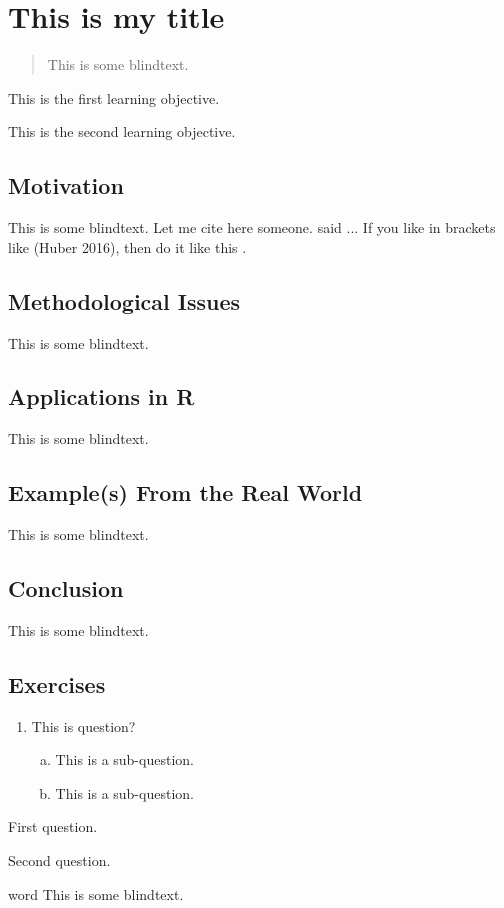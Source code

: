 \chapter{This is my title}\label{ch:topic1}
	
	\begin{abstract}
		This is some blindtext.
	\end{abstract}
	
	\begin{goals}
		\item This is the first learning objective. 
		\item This is the second learning objective. 
	\end{goals}
	
	\section{Motivation}

This is some blindtext.
Let me cite here someone. \citet{eck2016product} said ...
If you like in brackets like (Huber 2016), then do it like this \citep{eck2016product}.

	\section{Methodological Issues}

This is some blindtext.

	\section{Applications in R}\label{sec:applicationsinR}

This is some blindtext.

	\section{Example(s) From the Real World}\label{sec:examplerealworld}
This is some blindtext.

	\section{Conclusion}
This is some blindtext.

	\section{Exercises}
	\begin{enumerate}[(1)]
		\item This is question?
		\begin{enumerate}[a)]
			\item This is a sub-question.
			\item This is a sub-question.
		\end{enumerate}
	\end{enumerate}
	
	
	\begin{testquestion}
		\item First question.
		\item Second question.
	\end{testquestion}
	
	\begin{glossy}
		\item[word] This is some blindtext.
	\end{glossy}
	
